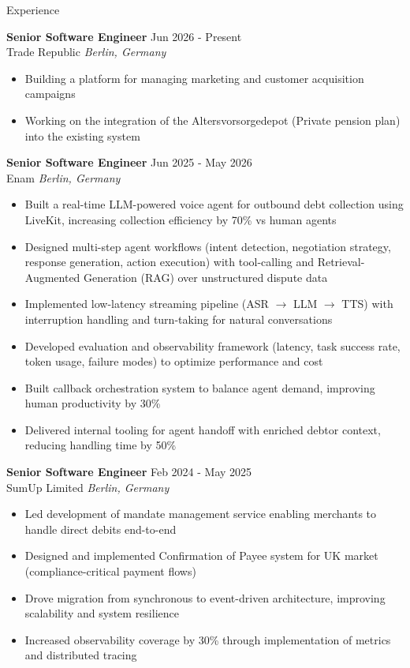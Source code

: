 \documentclass{resume}
\begin{document}
\begin{rSection}{Experience}

\textbf{Senior Software Engineer} \hfill Jun 2026 - Present\\
Trade Republic \hfill \textit{Berlin, Germany}
\begin{itemize}
    \itemsep -3pt {} 
    \item Building a platform for managing marketing and customer acquisition campaigns
    \item Working on the integration of the Altersvorsorgedepot (Private pension plan) into the existing system
\end{itemize}

\vspace{4bp}

\textbf{Senior Software Engineer} \hfill Jun 2025 - May 2026\\
Enam \hfill \textit{Berlin, Germany}
\begin{itemize}
    \itemsep -3pt {} 
    \item Built a real-time LLM-powered voice agent for outbound debt collection using LiveKit, increasing collection efficiency by 70\% vs human agents
    \item Designed multi-step agent workflows (intent detection, negotiation strategy, response generation, action execution) with tool-calling and Retrieval-Augmented Generation (RAG) over unstructured dispute data
    \item Implemented low-latency streaming pipeline (ASR $\rightarrow$ LLM $\rightarrow$ TTS) with interruption handling and turn-taking for natural conversations
    \item Developed evaluation and observability framework (latency, task success rate, token usage, failure modes) to optimize performance and cost
    \item Built callback orchestration system to balance agent demand, improving human productivity by 30\%
    \item Delivered internal tooling for agent handoff with enriched debtor context, reducing handling time by 50\%
\end{itemize}

\vspace{4bp}

\textbf{Senior Software Engineer} \hfill Feb 2024 - May 2025\\
SumUp Limited \hfill \textit{Berlin, Germany}
\begin{itemize}
    \itemsep -3pt {} 
    \item Led development of mandate management service enabling merchants to handle direct debits end-to-end
    \item Designed and implemented Confirmation of Payee system for UK market (compliance-critical payment flows)
    \item Drove migration from synchronous to event-driven architecture, improving scalability and system resilience
    \item Increased observability coverage by 30\% through implementation of metrics and distributed tracing
\end{itemize}


\end{rSection}
\end{document}

